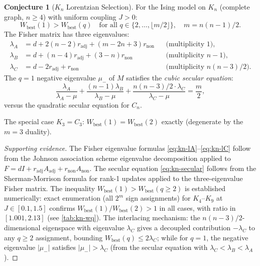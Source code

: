 \documentclass[11pt]{article}
\theoremstyle{definition}
\newtheorem{conjecture}[theorem]{Conjecture}
\theoremstyle{remark}
\newcommand{\Met}{M}
\begin{document}
\begin{conjecture}[$K_n$ Lorentzian Selection]
\label{thm:kn-lorentzian}
For the Ising model on $K_n$ (complete graph, $n \geq 4$) with uniform
coupling $J > 0$:
\begin{equation}
  W_{\mathrm{best}}(1) > W_{\mathrm{best}}(q)
  \quad \text{for all } q \in \{2, \ldots, \lfloor m/2 \rfloor\},
  \quad m = n(n-1)/2.
  \label{eq:kn-selection}
\end{equation}
The Fisher matrix has three eigenvalues:
\begin{align}
  \lambda_A &= d + 2(n-2)r_{\mathrm{adj}} + (m-2n+3)r_{\mathrm{non}}
    && \text{(multiplicity } 1\text{)}, \label{eq:kn-lA}\\
  \lambda_B &= d + (n-4)r_{\mathrm{adj}} + (3-n)r_{\mathrm{non}}
    && \text{(multiplicity } n-1\text{)}, \label{eq:kn-lB}\\
  \lambda_C &= d - 2r_{\mathrm{adj}} + r_{\mathrm{non}}
    && \text{(multiplicity } n(n-3)/2\text{)}. \label{eq:kn-lC}
\end{align}
The $q = 1$ negative eigenvalue $\mu_-$ of $\Met$ satisfies the
\emph{cubic secular equation}:
\begin{equation}
  \frac{\lambda_A}{\lambda_A - \mu}
  + \frac{(n-1)\lambda_B}{\lambda_B - \mu}
  + \frac{n(n-3)/2 \cdot \lambda_C}{\lambda_C - \mu}
  = \frac{m}{2},
  \label{eq:kn-secular}
\end{equation}
versus the quadratic secular equation for $C_n$.

The special case $K_3 = C_3$: $W_{\mathrm{best}}(1) = W_{\mathrm{best}}(2)$
exactly (degenerate by the $m = 3$ duality).
\end{conjecture}

\begin{proof}[Supporting evidence]
The Fisher eigenvalue formulas \eqref{eq:kn-lA}--\eqref{eq:kn-lC} follow
from the Johnson association scheme eigenvalue decomposition applied to
$F = dI + r_{\mathrm{adj}} A_{\mathrm{adj}} + r_{\mathrm{non}} A_{\mathrm{non}}$.
The secular equation \eqref{eq:kn-secular} follows from the Sherman-Morrison
formula for rank-1 updates applied to the three-eigenvalue Fisher matrix.
The inequality $W_{\mathrm{best}}(1) > W_{\mathrm{best}}(q \geq 2)$ is
established numerically: exact enumeration (all $2^m$ sign assignments)
for $K_4$--$K_9$ at $J \in [0.1, 1.5]$ confirms $W_{\mathrm{best}}(1) / W_{\mathrm{best}}(2)
> 1$ in all cases, with ratio in $[1.001, 2.13]$ (see \cref{tab:kn-wq}).
The interlacing mechanism: the $n(n-3)/2$-dimensional eigenspace with eigenvalue
$\lambda_C$ gives a decoupled contribution $-\lambda_C$ to any $q \geq 2$
assignment, bounding $W_{\mathrm{best}}(q) \leq 2\lambda_C$; while for $q = 1$,
the negative eigenvalue $|\mu_-|$ satisfies $|\mu_-| > \lambda_C$
(from the secular equation with $\lambda_C < \lambda_B < \lambda_A$).
\end{proof}
\end{document}
